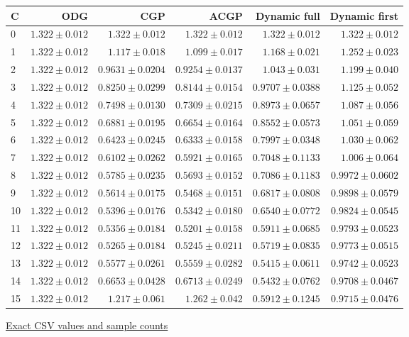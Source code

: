 \begin{center}{\scriptsize\setlength{\tabcolsep}{3pt}
\begin{tabular}{lrrrrr}
\toprule
C & ODG & CGP & ACGP & Dynamic full & Dynamic first \\
\midrule
0 & $1.322\pm0.012$ & $1.322\pm0.012$ & $1.322\pm0.012$ & $1.322\pm0.012$ & $1.322\pm0.012$ \\
1 & $1.322\pm0.012$ & $1.117\pm0.018$ & $1.099\pm0.017$ & $1.168\pm0.021$ & $1.252\pm0.023$ \\
2 & $1.322\pm0.012$ & $0.9631\pm0.0204$ & $0.9254\pm0.0137$ & $1.043\pm0.031$ & $1.199\pm0.040$ \\
3 & $1.322\pm0.012$ & $0.8250\pm0.0299$ & $0.8144\pm0.0154$ & $0.9707\pm0.0388$ & $1.125\pm0.052$ \\
4 & $1.322\pm0.012$ & $0.7498\pm0.0130$ & $0.7309\pm0.0215$ & $0.8973\pm0.0657$ & $1.087\pm0.056$ \\
5 & $1.322\pm0.012$ & $0.6881\pm0.0195$ & $0.6654\pm0.0164$ & $0.8552\pm0.0573$ & $1.051\pm0.059$ \\
6 & $1.322\pm0.012$ & $0.6423\pm0.0245$ & $0.6333\pm0.0158$ & $0.7997\pm0.0348$ & $1.030\pm0.062$ \\
7 & $1.322\pm0.012$ & $0.6102\pm0.0262$ & $0.5921\pm0.0165$ & $0.7048\pm0.1133$ & $1.006\pm0.064$ \\
8 & $1.322\pm0.012$ & $0.5785\pm0.0235$ & $0.5693\pm0.0152$ & $0.7086\pm0.1183$ & $0.9972\pm0.0602$ \\
9 & $1.322\pm0.012$ & $0.5614\pm0.0175$ & $0.5468\pm0.0151$ & $0.6817\pm0.0808$ & $0.9898\pm0.0579$ \\
10 & $1.322\pm0.012$ & $0.5396\pm0.0176$ & $0.5342\pm0.0180$ & $0.6540\pm0.0772$ & $0.9824\pm0.0545$ \\
11 & $1.322\pm0.012$ & $0.5356\pm0.0184$ & $0.5201\pm0.0158$ & $0.5911\pm0.0685$ & $0.9793\pm0.0523$ \\
12 & $1.322\pm0.012$ & $0.5265\pm0.0184$ & $0.5245\pm0.0211$ & $0.5719\pm0.0835$ & $0.9773\pm0.0515$ \\
13 & $1.322\pm0.012$ & $0.5577\pm0.0261$ & $0.5559\pm0.0282$ & $0.5415\pm0.0611$ & $0.9742\pm0.0523$ \\
14 & $1.322\pm0.012$ & $0.6653\pm0.0428$ & $0.6713\pm0.0249$ & $0.5432\pm0.0762$ & $0.9708\pm0.0467$ \\
15 & $1.322\pm0.012$ & $1.217\pm0.061$ & $1.262\pm0.042$ & $0.5912\pm0.1245$ & $0.9715\pm0.0476$ \\
\bottomrule\end{tabular}}
{\footnotesize\href{https://github.com/sanjeevkrishnaa/Compiler-Driven-ACE/blob/codex/ace-scheduler-correctness/docs/latex/qft96_final/data/allocation_mesh_max_reliability_m16.csv}{Exact CSV values and sample counts}}
\end{center}
